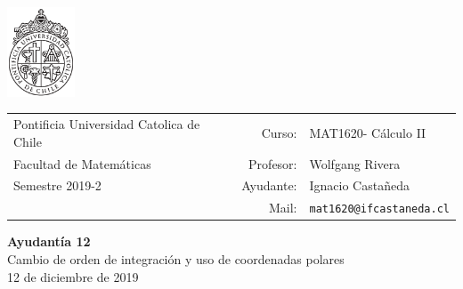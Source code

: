 \documentclass[12pt]{article}
\makeatletter
\newcommand{\ayudantia}{{\sc Ayudantía 12}}
\newcommand{\tituloayu}{Cambio de orden de integración y uso de coordenadas polares}
\newcommand{\fecha}{12 de diciembre de 2019}
\newcommand{\sigla}{MAT1620}
\newcommand{\nombre}{Cálculo II}
\newcommand{\profesor}{Wolfgang Rivera}
\newcommand{\ano}{2019}
\newcommand{\semestre}{2}
\newcommand{\mail}{mat1620@ifcastaneda.cl}
\makeatother
\begin{document}
\thispagestyle{empty}

\begin{minipage}{2cm}
	\includegraphics[width=2cm]{../../../../img/logo.pdf}
	\vspace{0.5cm}
\end{minipage}
\begin{minipage}{\linewidth}
	\begin{tabular}{lrl}
		{\scriptsize\sc Pontificia Universidad Catolica de Chile} & \hspace*{0.7in}Curso: &
		\sigla  - \nombre\\
		{\sc Facultad de Matemáticas}&
		Profesor: & \profesor \\
		{\sc Semestre \ano-\semestre} & Ayudante: & {Ignacio Castañeda}\\
		& {Mail:} & \texttt{\mail}
	\end{tabular}
\end{minipage}

\vspace{-10mm}
\begin{center}
	{\LARGE\bf \ayudantia}\\
	\vspace{0.1cm}
	{\tituloayu}\\
	\vspace{0.1cm}
	\fecha\\
	\vspace{0.4cm}
\end{center}
\end{document}
